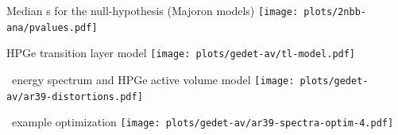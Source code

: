 \documentclass[10pt,aspectratio=169]{beamer}
\begin{document}
\begin{frame}{Median \pvalue{}s for the null-hypothesis (Majoron models)}
  \centering
  \texttt{[image: plots/2nbb-ana/pvalues.pdf]}
\end{frame}
\begin{frame}{HPGe transition layer model}
  \centering
  \texttt{[image: plots/gedet-av/tl-model.pdf]}
\end{frame}
\begin{frame}{\Arl\ energy spectrum and HPGe active volume model}
  \centering
  \texttt{[image: plots/gedet-av/ar39-distortions.pdf]}
\end{frame}
\begin{frame}{\Arl\ example optimization}
  \centering
  \texttt{[image: plots/gedet-av/ar39-spectra-optim-4.pdf]}
\end{frame}
\end{document}
